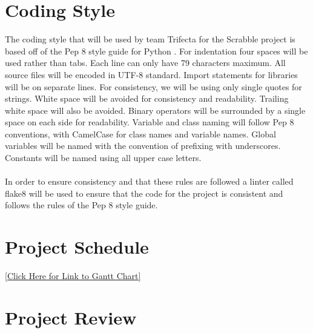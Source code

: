 \documentclass{article}
\begin{document}
\section{Coding Style} 
The coding style that will be used by team Trifecta for the Scrabble project is based off of the Pep 8 style guide for Python \cite{van_rossum_2013}. 
For indentation four spaces will be used rather than tabs. Each line can only have 79 characters maximum. All source files will be encoded in UTF-8 standard. Import statements for libraries will be on separate lines. For consistency, we will be using only single quotes for strings. White space will be avoided for consistency and readability. Trailing white space will also be avoided. Binary operators will be surrounded by a single space on each side for readability. Variable and class naming will follow Pep 8 conventions, with CamelCase for class names and variable names. Global variables will be named with the convention of prefixing with underscores. Constants will be named using all upper case letters. \\ \\
In order to ensure consistency and that these rules are followed a linter called flake8 will be used to ensure that the code for the project is consistent and follows the rules of the Pep 8 style guide. 

\section{Project Schedule}

\href{https://gitlab.cas.mcmaster.ca/choudhrk/thetrifecta_scrabble/blob/master/ProjectSchedule/3XA3\%20Gantt\%20Chart.pdf}{[Click Here for Link to Gantt Chart]}

\section{Project Review}

\newpage
 

\end{document}
